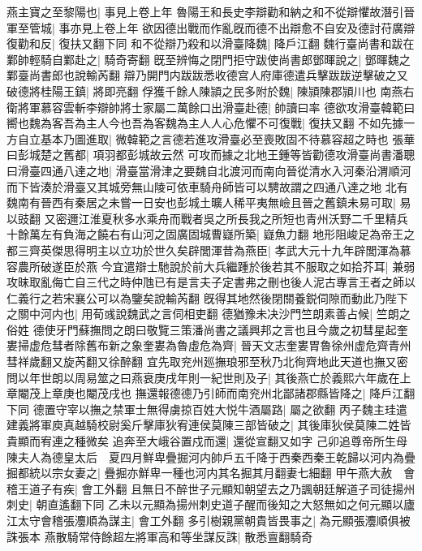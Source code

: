 燕主寶之至黎陽也|{
	事見上卷上年}
魯陽王和長史李辯勸和納之和不從辯懼故潛引晉軍至管城|{
	事亦見上卷上年}
欲因德出戰而作亂旣而德不出辯愈不自安及德討苻廣辯復勸和反|{
	復扶又翻下同}
和不從辯乃殺和以滑臺降魏|{
	降戶江翻}
魏行臺尚書和跋在鄴帥輕騎自鄴赴之|{
	騎奇寄翻}
旣至辨悔之閉門拒守跋使尚書郎鄧暉說之|{
	鄧暉魏之鄴臺尚書郎也說輸芮翻}
辯乃開門内跋跋悉收德宫人府庫德遣兵擊跋跋逆擊破之又破德將桂陽王鎮|{
	將即亮翻}
俘獲千餘人陳頴之民多附於魏|{
	陳頴陳郡頴川也}
南燕右衛將軍慕容雲斬李辯帥將士家屬二萬餘口出滑臺赴德|{
	帥讀曰率}
德欲攻滑臺韓範曰嚮也魏為客吾為主人今也吾為客魏為主人人心危懼不可復戰|{
	復扶又翻}
不如先據一方自立基本乃圖進取|{
	微韓範之言德若進攻滑臺必至喪敗固不待慕容超之時也}
張華曰彭城楚之舊都|{
	項羽都彭城故云然}
可攻而據之北地王鍾等皆勸德攻滑臺尚書潘聰曰滑臺四通八達之地|{
	滑臺當滑津之要魏自北渡河而南向晉從清水入河秦沿渭順河而下皆湊於滑臺又其城旁無山陵可依車騎舟師皆可以騁故謂之四通八達之地}
北有魏南有晉西有秦居之未嘗一日安也彭城土曠人稀平夷無嶮且晉之舊鎮未易可取|{
	易以豉翻}
又密邇江淮夏秋多水乘舟而戰者吳之所長我之所短也青州沃野二千里精兵十餘萬左有負海之饒右有山河之固廣固城曹嶷所築|{
	嶷魚力翻}
地形阻峻足為帝王之都三齊英傑思得明主以立功於世久矣辟閭渾昔為燕臣|{
	孝武大元十九年辟閭渾為慕容農所破遂臣於燕}
今宜遣辯士馳說於前大兵繼踵於後若其不服取之如拾芥耳|{
	兼弱攻昧取亂侮亡自三代之時仲虺已有是言夫子定書弗之刪也後人泥古專言王者之師以仁義行之若宋襄公可以為鑒矣說輸芮翻}
旣得其地然後閉關養鋭伺隙而動此乃陛下之關中河内也|{
	用荀彧說魏武之言伺相吏翻}
德猶豫未决沙門竺朗素善占候|{
	竺朗之俗姓}
德使牙門蘇撫問之朗曰敬覽三策潘尚書之議興邦之言也且今歲之初彗星起奎婁掃虚危彗者除舊布新之象奎婁為魯虛危為齊|{
	晉天文志奎婁胃魯徐州虚危齊青州彗祥歲翻又旋芮翻又徐醉翻}
宜先取兖州廵撫琅邪至秋乃北徇齊地此天道也撫又密問以年世朗以周易筮之曰燕衰庚戌年則一紀世則及子|{
	其後燕亡於義熙六年歲在上章閹茂上章庚也閹茂戌也}
撫還報德德乃引師而南兖州北鄙諸郡縣皆降之|{
	降戶江翻下同}
德置守宰以撫之禁軍士無得虜掠百姓大悦牛酒屬路|{
	屬之欲翻}
丙子魏主珪遣建義將軍庾真越騎校尉奚斤擊庫狄宥連侯莫陳三部皆破之|{
	其後庫狄侯莫陳二姓皆貴顯而宥連之種微矣}
追奔至大峨谷置戍而還|{
	還從宣翻又如字}
己卯追尊帝所生母陳夫人為德皇太后　夏四月鮮卑疊掘河内帥戶五千降于西秦西秦王乾歸以河内為疊掘都統以宗女妻之|{
	疊掘亦鮮卑一種也河内其名掘其月翻妻七細翻}
甲午燕大赦　會稽王道子有疾|{
	會工外翻}
且無日不醉世子元顯知朝望去之乃諷朝廷解道子司徒揚州刺史|{
	朝直遙翻下同}
乙未以元顯為揚州刺史道子醒而後知之大怒無如之何元顯以廬江太守會稽張灋順為謀主|{
	會工外翻}
多引樹親黨朝貴皆畏事之|{
	為元顯張灋順俱被誅張本}
燕散騎常侍餘超左將軍高和等坐謀反誅|{
	散悉亶翻騎奇}


